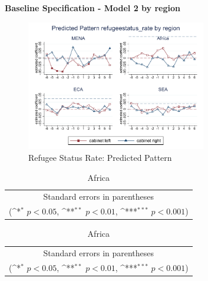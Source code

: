 \documentclass[10pt,a4paper]{scrartcl}
\begin{document}
\clearpage
\textbf{Baseline Specification - Model 2 by region}

\begin{figure}[!ht]
	\centering
	\includegraphics[width=0.7\textwidth]{figures_edited/refugeestatus_rate_graph2_by_region.pdf}
	\caption{Refugee Status Rate: Predicted Pattern}
\end{figure}

\begin{table}[!ht]\centering
	\footnotesize
	\renewcommand{\arraystretch}{1.1}
	\def\sym#1{\ifmmode^{#1}\else\(^{#1}\)\fi}
	\caption{Refugee Status Rate: Predicted Pattern}
	\begin{subtable}{.5\linewidth}
		\centering
		\caption{Middle East and North Africa}
		\begin{tabular}{l*{2}{c}}
			\hline\hline
			
			\hline\hline
			\multicolumn{3}{c}{\footnotesize Standard errors in parentheses} \\
			\multicolumn{3}{c}{\footnotesize (\sym{*} \(p<0.05\), \sym{**} \(p<0.01\), \sym{***} \(p<0.001\))}\\
		\end{tabular}
	\end{subtable}%
	\begin{subtable}{.5\linewidth}
		\centering
		\caption{Africa}
		\begin{tabular}{l*{2}{c}}
			\hline\hline
			
			\hline\hline
			\multicolumn{3}{c}{\footnotesize Standard errors in parentheses} \\
			\multicolumn{3}{c}{\footnotesize (\sym{*} \(p<0.05\), \sym{**} \(p<0.01\), \sym{***} \(p<0.001\))}\\
		\end{tabular}
	\end{subtable}%
\end{table}
\end{document}
